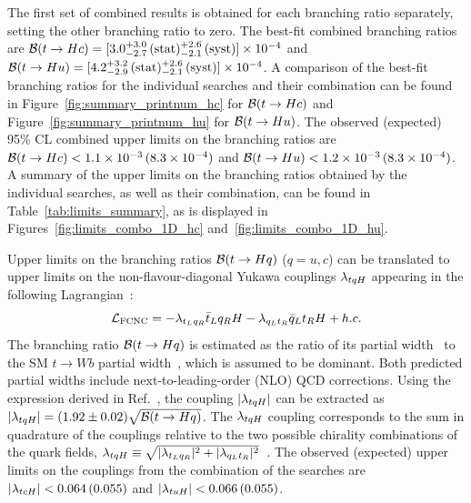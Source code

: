 The first set of combined results is obtained for each branching ratio separately, setting the other branching ratio to zero.
The best-fit combined branching ratios are $\mathcal{B}(t\to Hc)=[3.0^{+3.0}_{-2.7}\,(\mathrm{stat})^{+2.6}_{-2.1}\,(\mathrm{syst})] \times 10^{-4}$ and 
$\mathcal{B}(t\to Hu)=[4.2^{+3.2}_{-2.9}\,(\mathrm{stat})^{+2.6}_{-2.1}\,(\mathrm{syst})] \times 10^{-4}$.  
A comparison of the best-fit branching ratios for the individual searches and their combination can be found in Figure~\ref{fig:summary_printnum_hc} 
for $\mathcal{B}(t\to Hc)$ and Figure~\ref{fig:summary_printnum_hu} for $\mathcal{B}(t\to Hu)$.
The observed (expected) 95\% CL combined upper limits on the branching ratios are 
$\mathcal{B}(t\to Hc)<1.1 \times 10^{-3}\,(8.3 \times 10^{-4})$ and $\mathcal{B}(t\to Hu)<1.2 \times 10^{-3}\,(8.3 \times 10^{-4})$.
A summary of the upper limits on the branching ratios obtained by the individual searches, as well as their combination, 
can be found in Table~\ref{tab:limits_summary}, as is displayed in Figures~\ref{fig:limits_combo_1D_hc} and~\ref{fig:limits_combo_1D_hu}.

Upper limits on the branching ratios $\mathcal{B}(t\to Hq)$ ($q=u,c$) can be translated to upper limits on the non-flavour-diagonal Yukawa couplings $\lambda_{tqH}$ 
appearing in the following Lagrangian~\cite{Harnik:2012pb}:
\begin{equation}
{\cal L}_\mathrm{FCNC} = -\lambda_{t_L q_R} \bar{t}_L q_R H - \lambda_{q_L t_R} \bar{q}_L t_R H  + h.c.
\end{equation}
The branching ratio $\mathcal{B}(t\to Hq)$ is estimated as the ratio of its partial width~\cite{Zhang:2013xya} to the SM $t \to Wb$ partial width~\cite{Denner:1990ns}, 
which is assumed to be dominant. Both predicted partial widths include next-to-leading-order (NLO) QCD corrections.
Using the expression derived in Ref.~\cite{Aad:2014dya}, the coupling $|\lambda_{tqH}|$ can be extracted as $| \lambda_{tqH} | = (1.92 \pm 0.02) \sqrt{\mathcal{B}(t\to Hq)}$.
The $\lambda_{tqH}$ coupling corresponds to the sum in quadrature of the couplings relative to the two possible chirality combinations of the quark fields, 
$\lambda_{tqH} \equiv \sqrt{ |\lambda_{t_Lq_R}|^2 +   |\lambda_{q_L t_R}|^2 }$~\cite{Harnik:2012pb}.
The observed (expected) upper limits on the couplings from the combination of the searches are $|\lambda_{tcH}|<0.064\,(0.055)$ and $|\lambda_{tuH}|<0.066\,(0.055)$.

